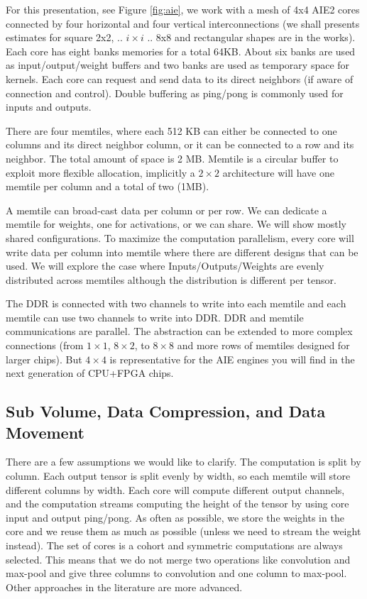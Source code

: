 \documentclass[conference]{IEEEtran}
\begin{document}
For this presentation, see Figure \ref{fig:aie}, we work with a mesh
of 4x4 AIE2 cores connected by four horizontal and four vertical
interconnections (we shall presents estimates for square 2x2,
.. $i\times i$ .. 8x8 and rectangular shapes are in the works). Each
core has eight banks memories for a total 64KB. About six banks are
used as input/output/weight buffers and two banks are used as
temporary space for kernels. Each core can request and send data to
its direct neighbors (if aware of connection and control). Double
buffering as ping/pong is commonly used for inputs and outputs.

There are four memtiles, where each 512 KB can either be connected to
one columns and its direct neighbor column, or it can be connected to
a row and its neighbor. The total amount of space is 2 MB. Memtile is a
circular buffer to exploit more flexible allocation, implicitly a $2
\times 2$ architecture will have one memtile per column and a total of
two (1MB).

A memtile can broad-cast data per column or per row. We can dedicate a
memtile for weights, one for activations, or we can share. We will
show mostly shared configurations. To maximize the computation
parallelism, every core will write data per column into memtile where
there are different designs that can be used. We will explore the case
where Inputs/Outputs/Weights are evenly distributed across memtiles
although the distribution is different per tensor.

The DDR is connected with two channels to write into each memtile and
each memtile can use two channels to write into DDR. DDR and memtile
communications are parallel.  The abstraction can be extended to more
complex connections (from $1\times 1$, $8\times 2$, to $8\times 8$ and
more rows of memtiles designed for larger chips). But $4\times 4$ is
representative for the AIE engines you will find in the next
generation of CPU+FPGA chips.


\subsection{Sub Volume, Data Compression, and Data Movement}
There are a few assumptions we would like to clarify. The computation
is split by column. Each output tensor is split evenly by width, so
each memtile will store different columns by width. Each core will
compute different output channels, and the computation streams
computing the height of the tensor by using core input and output
ping/pong. As often as possible, we store the weights in the core and
we reuse them as much as possible (unless we need to stream the weight
instead). The set of cores is a cohort and symmetric computations are
always selected. This means that we do not merge two operations like
convolution and max-pool and give three columns to convolution and one
column to max-pool. Other approaches in the literature are more
advanced.
\end{document}
